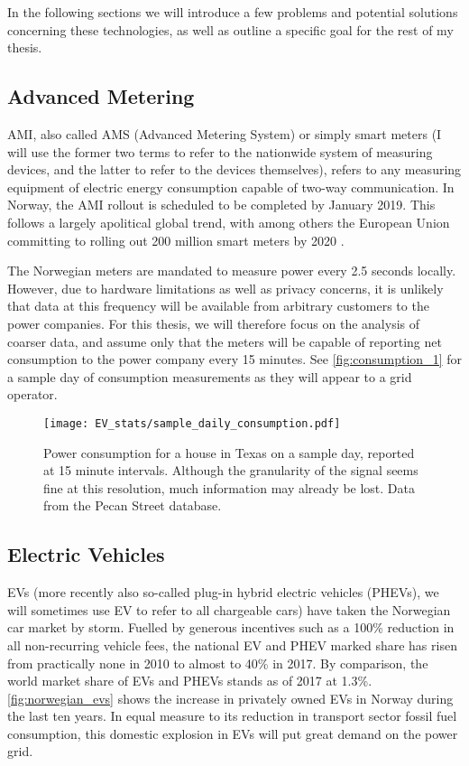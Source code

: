 \documentclass[12pt, american]{article}
\begin{document}
In the following sections we will introduce a few problems and potential solutions concerning these technologies, as well as outline a specific goal for the rest of my thesis.

\subsection{Advanced Metering}

AMI, also called AMS (Advanced Metering System) or simply smart meters (I will use the former two terms to refer to the nationwide system of measuring devices, and the latter to refer to the devices themselves), refers to any measuring equipment of electric energy consumption capable of two-way communication. In Norway, the AMI rollout is scheduled to be completed by January 2019. This follows a largely apolitical global trend, with among others the European Union committing to rolling out 200 million smart meters by 2020 \cite{EuropeanCommision2018}. 

The Norwegian meters are mandated to measure power every 2.5 seconds locally. However, due to hardware limitations as well as privacy concerns, it is unlikely that data at this frequency will be available from arbitrary customers to the power companies. For this thesis, we will therefore focus on the analysis of coarser data, and assume only that the meters will be capable of reporting net consumption to the power company every 15 minutes. See \autoref{fig:consumption_1} for a sample day of consumption measurements as they will appear to a grid operator.

\begin{figure}[h]
\centering
\def\svgwidth{\columnwidth}
\caption{Power consumption for a house in Texas on a sample day, reported at 15 minute intervals. Although the granularity of the signal seems fine at this resolution, much information may already be lost. Data from the Pecan Street database.}
\texttt{[image: EV\_stats/sample\_daily\_consumption.pdf]}
\label{fig:consumption_1}
\end{figure}


\subsection{Electric Vehicles}

EVs (more recently also so-called plug-in hybrid electric vehicles (PHEVs), we will sometimes use EV to refer to all chargeable cars) have taken the Norwegian car market by storm. Fuelled by generous incentives such as a 100\% reduction in all non-recurring vehicle fees, the national EV and PHEV marked share has risen from practically none in 2010 to almost to 40\% in 2017\cite{Norskelbilforening2018}. By comparison, the world market share of EVs and PHEVs stands as of 2017 at 1.3\%\cite{EVvolu}. \autoref{fig:norwegian_evs} shows the increase in privately owned EVs in Norway during the last ten years. In equal measure to its reduction in transport sector fossil fuel consumption, this domestic explosion in EVs will put great demand on the power grid. 
\end{document}

